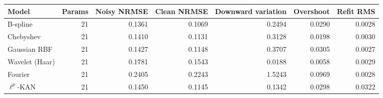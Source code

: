 \begin{tabular}{lrrrrrr}
\toprule
Model & Params & Noisy NRMSE & Clean NRMSE & Downward variation & Overshoot & Refit RMS \\
\midrule
B-spline & 21 & 0.1361 & 0.1069 & 0.2494 & 0.0290 & 0.0028 \\
Chebyshev & 21 & 0.1410 & 0.1131 & 0.3128 & 0.0198 & 0.0030 \\
Gaussian RBF & 21 & 0.1427 & 0.1148 & 0.3707 & 0.0305 & 0.0027 \\
Wavelet (Haar) & 21 & 0.1781 & 0.1543 & 0.0188 & 0.0058 & 0.0029 \\
Fourier & 21 & 0.2405 & 0.2243 & 1.5243 & 0.0969 & 0.0028 \\
$\ell^p$-KAN & 21 & 0.1450 & 0.1145 & 0.1342 & 0.0298 & 0.0322 \\
\bottomrule
\end{tabular}
